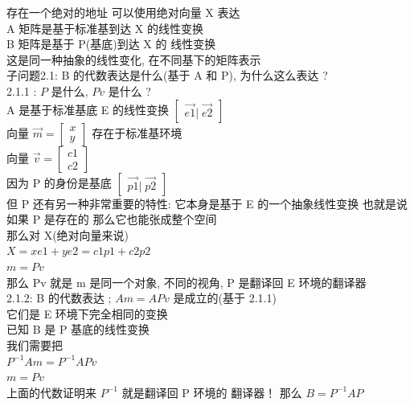 \documentclass[12pt]{article}
\begin{document}
\begin{flushleft}
\begin{itemize}
              存在一个绝对的地址 可以使用绝对向量 X 表达 \\
              A 矩阵是基于标准基到达 X 的线性变换 \\
              B 矩阵是基于 P(基底)到达 X 的 线性变换 \\
              这是同一种抽象的线性变化, 在不同基下的矩阵表示 \\
              子问题2.1: B 的代数表达是什么(基于 A 和 P), 为什么这么表达 ? \\
              2.1.1 : $P$ 是什么, $Pv$ 是什么  ? \\
              A 是基于标准基底 E 的线性变换 $\begin{bmatrix}
                      \vec{e1} | \; \vec{e2}
                  \end{bmatrix}$ \\
              向量 $\vec{m} = \begin{bmatrix}
                      x \\
                      y
                  \end{bmatrix}$ 存在于标准基环境  \\
              向量 $\vec{v} = \begin{bmatrix}
                      c1 \\
                      c2
                  \end{bmatrix}$ \\
              因为 P 的身份是基底  $\begin{bmatrix}
                      \vec{p1} | \; \vec{p2}
                  \end{bmatrix}$\\
              但 P 还有另一种非常重要的特性: 它本身是基于 E 的一个抽象线性变换
              也就是说 如果 P 是存在的 那么它也能张成整个空间 \\
              那么对 X(绝对向量来说) \\
              $X = xe1 + ye2 =  c1p1 + c2p2$ \\
              $m = Pv $ \\
              那么 Pv 就是 m 是同一个对象, 不同的视角, P 是翻译回 E 环境的翻译器 \\
              2.1.2: B 的代数表达 ;
              $Am = APv$ 是成立的(基于 2.1.1) \\
              它们是 E 环境下完全相同的变换 \\
              已知 B 是 P 基底的线性变换  \\
              我们需要把 \\
              $P^{-1}Am = P^{-1}APv$ \\
              $ m = Pv$ \\
              上面的代数证明来 $P^{-1}$ 就是翻译回 P 环境的 翻译器！
              那么 $B = P^{-1}AP $


\end{itemize}
\end{flushleft}
\end{document}
